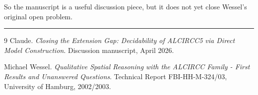 \documentclass[11pt]{article}
\begin{document}
So the manuscript is a useful discussion piece, but it does not yet close Wessel's original open problem.

\vspace{0.7em}
\noindent\rule{\linewidth}{0.4pt}

\begin{thebibliography}{9}
Claude.
\newblock \emph{Closing the Extension Gap: Decidability of ALCIRCC5 via Direct Model Construction}.
\newblock Discussion manuscript, April 2026.

Michael Wessel.
\newblock \emph{Qualitative Spatial Reasoning with the ALCIRCC Family - First Results and Unanswered Questions}.
\newblock Technical Report FBI-HH-M-324/03, University of Hamburg, 2002/2003.
\end{thebibliography}
\end{document}
